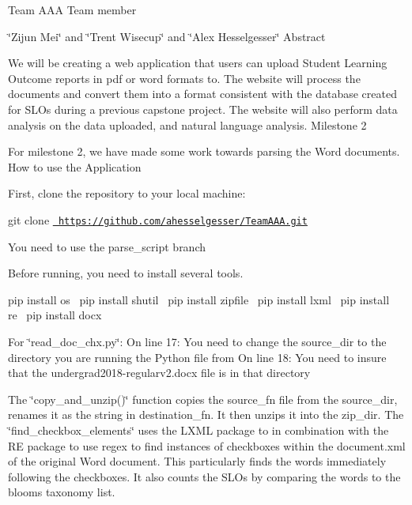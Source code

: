 Team AAA Team member

\char`\"{}\+Zijun Mei\char`\"{} and \char`\"{}\+Trent Wisecup\char`\"{} and \char`\"{}\+Alex Hesselgesser\char`\"{} Abstract

We will be creating a web application that users can upload Student Learning Outcome reports in pdf or word formats to. The website will process the documents and convert them into a format consistent with the database created for SLOs during a previous capstone project. The website will also perform data analysis on the data uploaded, and natural language analysis. Milestone 2

For milestone 2, we have made some work towards parsing the Word documents. How to use the Application

First, clone the repository to your local machine\+:

git clone \href{https://github.com/ahesselgesser/TeamAAA.git}{\texttt{ https\+://github.\+com/ahesselgesser/\+Team\+AAA.\+git}}

You need to use the parse\+\_\+script branch

Before running, you need to install several tools.

pip install os~\newline
 pip install shutil~\newline
 pip install zipfile~\newline
 pip install lxml~\newline
 pip install re~\newline
 pip install docx~\newline


For \char`\"{}read\+\_\+doc\+\_\+chx.\+py\char`\"{}\+: On line 17\+: You need to change the source\+\_\+dir to the directory you are running the Python file from On line 18\+: You need to insure that the undergrad2018-\/regularv2.\+docx file is in that directory

The \char`\"{}copy\+\_\+and\+\_\+unzip()\char`\"{} function copies the source\+\_\+fn file from the source\+\_\+dir, renames it as the string in destination\+\_\+fn. It then unzips it into the zip\+\_\+dir. The \char`\"{}find\+\_\+checkbox\+\_\+elements\char`\"{} uses the LXML package to in combination with the RE package to use regex to find instances of checkboxes within the document.\+xml of the original Word document. This particularly finds the words immediately following the checkboxes. It also counts the SLO\textquotesingle{}s by comparing the words to the bloom\textquotesingle{}s taxonomy list.


